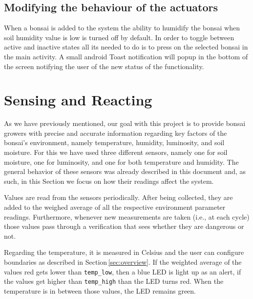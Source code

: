\documentclass{article}
\begin{document}
\subsection{Modifying the behaviour of the actuators}
When a bonsai is added to the system the ability to humidify the bonsai when
soil humidity value is low is turned off by default. In order to toggle between
active and inactive states all its needed to do is to press on the selected
bonsai in the main activity. A small android Toast notification will popup in
the bottom of the screen notifying the user of the new status of the
functionality.

\section{Sensing and Reacting}\label{sec:sensors_actuators}

As we have previously mentioned, our goal with this project is to provide bonsai
growers with precise and accurate information regarding key factors of the
bonsai's environment, namely temperature, humidity, luminosity, and soil
moisture. For this we have used three different sensors, namely one for soil
moisture, one for luminosity, and one for both temperature and humidity. The
general behavior of these sensors was already described in this document and, as
such, in this Section we focus on how their readings affect the system.

Values are read from the sensors periodically. After being collected, they are
added to the weighed average of all the respective environment parameter
readings. Furthermore, whenever new measurements are taken (i.e., at each cycle)
those values pass through a verification that sees whether they are dangerous or
not.

Regarding the temperature, it is measured in Celsius and the user can configure
boundaries as described in Section\,\ref{sec:overview}. If the weighted average
of the values red gets lower than \texttt{temp\_low}, then a blue LED is light
up as an alert, if the values get higher than \texttt{temp\_high} than the LED
turns red. When the temperature is in between those values, the LED remains
green.
\end{document}
